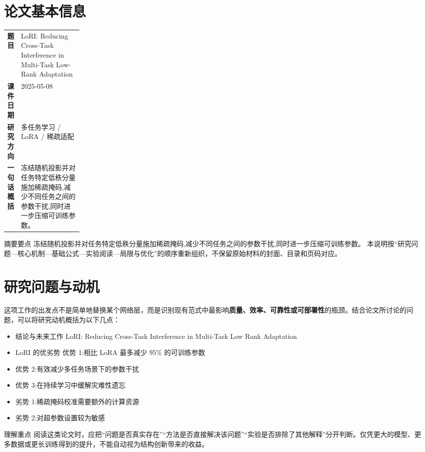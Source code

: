 \documentclass[UTF8,11pt,a4paper]{ctexart}
\newcommand{\term}[1]{\textbf{\textcolor{mainblue}{#1}}}
\begin{document}
\section{论文基本信息}
\begin{center}
\begin{tabularx}{0.94\linewidth}{>{\bfseries}p{0.18\linewidth}X}
\toprule
题目 & LoRI: Reducing Cross-Task Interference in Multi-Task Low-Rank Adaptation\\
课件日期 & 2025-05-08\\
研究方向 & 多任务学习 / LoRA / 稀疏适配\\
一句话概括 & 冻结随机投影并对任务特定低秩分量施加稀疏掩码,减少不同任务之间的参数干扰,同时进一步压缩可训练参数。\\
\bottomrule
\end{tabularx}
\end{center}

\begin{infobox}{摘要要点}
冻结随机投影并对任务特定低秩分量施加稀疏掩码,减少不同任务之间的参数干扰,同时进一步压缩可训练参数。 本说明按“研究问题—核心机制—基础公式—实验阅读—局限与优化”的顺序重新组织，不保留原始材料的封面、目录和页码对应。
\end{infobox}

\section{研究问题与动机}
这项工作的出发点不是简单地替换某个网络层，而是识别现有范式中最影响\term{质量、效率、可靠性或可部署性}的瓶颈。结合论文所讨论的问题，可以将研究动机概括为以下几点：
\begin{itemize}
\item 结论与未来工作 LoRI: Reducing Cross-Task Interference in Multi-Task Low Rank Adaptation
\item LoRI 的优劣势 优势 1:相比 LoRA 最多减少 95\% 的可训练参数
\item 优势 2:有效减少多任务场景下的参数干扰
\item 优势 3:在持续学习中缓解灾难性遗忘
\item 劣势 1:稀疏掩码校准需要额外的计算资源
\item 劣势 2:对超参数设置较为敏感
\end{itemize}

\begin{notebox}{理解重点}
阅读这类论文时，应把“问题是否真实存在”“方法是否直接解决该问题”“实验是否排除了其他解释”分开判断。仅凭更大的模型、更多数据或更长训练得到的提升，不能自动视为结构创新带来的收益。
\end{notebox}
\end{document}
